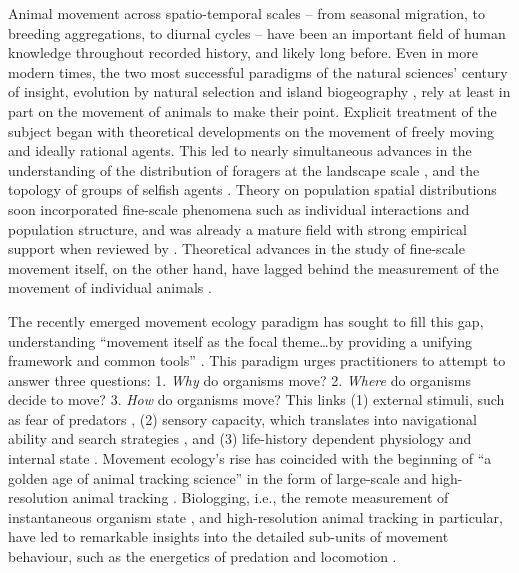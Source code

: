 Animal movement across spatio-temporal scales -- from seasonal
migration, to breeding aggregations, to diurnal cycles -- have been an
important field of human knowledge throughout recorded history, and
likely long before. Even in more modern times, the two most successful
paradigms of the natural sciences' century of insight, evolution by
natural selection \citep{darwin1858} and island biogeography
\citep{macarthur2001}, rely at least in part on the movement of animals
to make their point. Explicit treatment of the subject began with
theoretical developments on the movement of freely moving and ideally
rational agents. This led to nearly simultaneous advances in the
understanding of the distribution of foragers at the landscape scale
\citep{fretwell1970}, and the topology of groups of selfish agents
\citep{hamilton1971}. Theory on population spatial distributions soon
incorporated fine-scale phenomena such as individual interactions and
population structure, and was already a mature field with strong
empirical support when reviewed by \citet{sutherland1996}. Theoretical
advances in the study of fine-scale movement itself, on the other hand,
have lagged behind the measurement of the movement of individual animals
\citep{holyoak2008}.

The recently emerged movement ecology paradigm
\citep[MEP;][]{nathan2008a} has sought to fill this gap, understanding
``movement itself as the focal theme\ldots{}by providing a unifying
framework and common tools'' \citep{nathan2008}. This paradigm urges
practitioners to attempt to answer three questions: 1. \emph{Why} do
organisms move? 2. \emph{Where} do organisms decide to move? 3.
\emph{How} do organisms move? This links (1) external stimuli, such as
fear of predators \citep{laundre2001}, (2) sensory capacity, which
translates into navigational ability and search strategies
\citep[e.g.][]{bartumeus2008}, and (3) life-history dependent physiology
and internal state \citep[eg.][]{fryxell2008}. Movement ecology's rise
has coincided with the beginning of ``a golden age of animal tracking
science'' in the form of large-scale and high-resolution animal tracking
\citep{hussey2015, kays2015}. Biologging, i.e., the remote measurement
of instantaneous organism state \citep{cooke2004}, and high-resolution
animal tracking in particular, have led to remarkable insights into the
detailed sub-units of movement behaviour, such as the energetics of
predation and locomotion \citep[see
e.g.][]{williams2004, scantlebury2014}.

